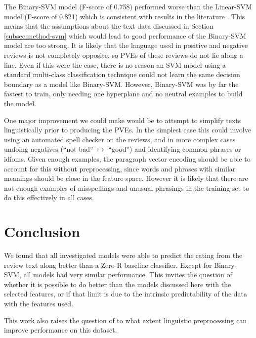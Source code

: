 \documentclass[11pt]{article}
\begin{document}
The Binary-SVM model (F-score of 0.758) performed worse than the Linear-SVM model (F-score of 0.821) which is consistent with results in the literature \cite{koppel_importance_2006}. This means that the assumptions about the text data discussed in Section \ref{subsec:method-svm} which would lead to good performance of the Binary-SVM model are too strong. It is likely that the language used in positive and negative reviews is not completely opposite, so PVEs of these reviews do not lie along a line. Even if this were the case, there is no reason an SVM model using a standard multi-class classification technique could not learn the same decision boundary as a model like Binary-SVM. However, Binary-SVM was by far the fastest to train, only needing one hyperplane and no neutral examples to build the model.

One major improvement we could make would be to attempt to simplify texts linguistically prior to producing the PVEs. In the simplest case this could involve using an automated spell checker on the reviews, and in more complex cases undoing negatives (``not bad'' $\mapsto$ ``good'') and identifying common phrases or idioms. Given enough examples, the paragraph vector encoding should be able to account for this without preprocessing, since words and phrases with similar meanings should be close in the feature space. However it is likely that there are not enough examples of misspellings and unusual phrasings in the training set to do this effectively in all cases.

\section{Conclusion}
We found that all investigated models were able to predict the rating from the review text along better than a Zero-R baseline classifier. Except for Binary-SVM, all models had very similar performance. This invites the question of whether it is possible to do better than the models discussed here with the selected features, or if that limit is due to the intrinsic predictability of the data with the features used. 

This work also raises the question of to what extent linguistic preprocessing can improve performance on this dataset.


\nocite{mukherjee_what_2013}
\nocite{rayana_collective_2015}

\nocite{sklearn_pedregosa_scikit-learn_2011}
\nocite{gensim_rehurek_software_2010}


\end{document}
